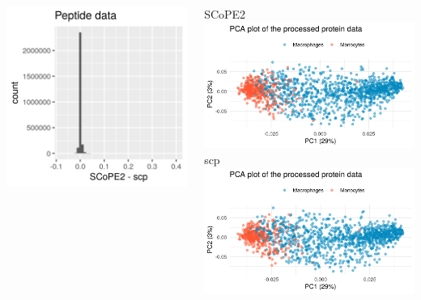 \documentclass{beamer}
\newcommand{\hcode}[2][lgray]{{\ttfamily\color{vdgray}\colorbox{#1}{#2}}}
\begin{document}
\begin{frame}
\begin{columns}
    \includegraphics[width=\linewidth]{figs/peptide_error.png}
  
    SCoPE2\\
    \includegraphics[width=\linewidth]{figs/wPCA_SCoPE2.png}
    \hcode{scp}\\
    \includegraphics[width=\linewidth]{figs/wPCA_scp.png}
  
  \end{columns}
  
\end{frame}
\end{document}
